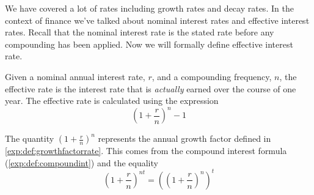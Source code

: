 We have covered a lot of rates including growth rates and decay rates. In the context of finance we've talked 
about nominal interest rates and effective interest rates. Recall that the nominal interest rate 
is the stated rate before any compounding has been applied.
Now we will formally define effective interest rate.
			
\begin{pccdefinition}
	Given a nominal annual interest rate, $r$, and a compounding frequency, $n$, the effective rate 
	is the interest rate that is \emph{actually} earned over the course of one year. 
	The effective rate is calculated using the expression
	\[
		\left( 1+\frac{r}{n} \right)^n - 1
	\]
										
	The quantity $\left( 1+\frac{r}{n} \right)^n$ represents the annual growth factor defined in \cref{exp:def:growthfactorrate}.
	This comes from the compound interest formula (\cref{exp:def:compoundint}) and the equality
	\[
		\left( 1+\frac{r}{n} \right)^{nt}= \left(\left( 1+\frac{r}{n} \right)^n\right)^t 
	\]
	\mbox{}
\end{pccdefinition}
			
